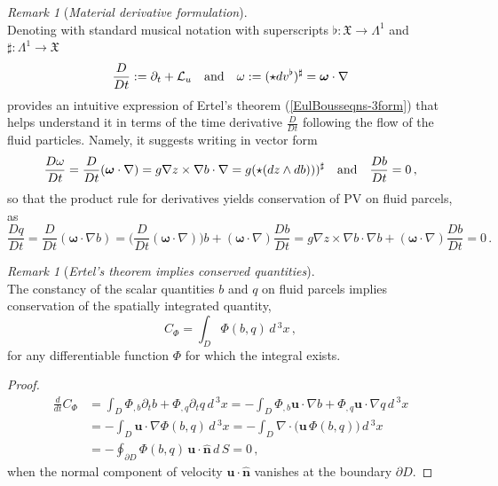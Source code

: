 \documentclass[11pt, oneside]{article}   	%
\numberwithin{equation}{section}
\theoremstyle{plain}
\theoremstyle{definition}
\theoremstyle{remark}
\newtheorem{remark}[theorem]{Remark}
\newcommand{\<}{\langle}
\renewcommand{\>}{\rangle}
\begin{document}
 \begin{remark}[\emph{Material derivative formulation}]$\,$\\ \textrm
% 
Denoting with standard musical notation with superscripts $\flat: \mathfrak{X}\to \Lambda^1$ and $\sharp: \Lambda^1 \to \mathfrak{X}$
\[
\frac{D}{Dt} := \partial_t +  \mathcal{L}_u
\quad\hbox{and}\quad
\omega := ( \star dv^\flat  )^\sharp = \boldsymbol{\omega}\cdot\nabla
\]
provides an intuitive expression of Ertel's theorem (\ref{EulBousseqns-3form}) that helps understand it in terms of the time derivative $\frac{D}{Dt}$ following the flow of the fluid particles. Namely, it suggests writing in vector form
\[
\frac{D\omega}{Dt}
=
\frac{D}{Dt}(\boldsymbol{\omega}\cdot\nabla )
= g\nabla{z}\times\nabla{b}\cdot\nabla
= g (\star( dz\wedge db)) )^\sharp
\quad\hbox{and}\quad
\frac{Db}{Dt} = 0
\,,
\]
so that the product rule for derivatives yields conservation of PV on fluid parcels, as 
\[
\frac{Dq}{Dt}
=
\frac{D}{Dt}(\boldsymbol{\omega}\cdot\nabla{b})
=
\Big(\frac{D}{Dt}(\boldsymbol{\omega}\cdot\nabla)\Big)b
+
(\boldsymbol{\omega}\cdot\nabla)\frac{Db}{Dt}
= g\nabla{z}\times\nabla{b}\cdot\nabla{b} + 
(\boldsymbol{\omega}\cdot\nabla)\frac{Db}{Dt} = 0
\,.
\]
 
 \end{remark}

\begin{remark}[\emph{Ertel's theorem implies conserved quantities}]$\,$\\ \textrm
The constancy of the scalar quantities $b$ and $q$ on fluid parcels implies conservation of the spatially integrated quantity,
 \begin{equation}
 C_\Phi
 =
 \int_D \Phi(b,q)\,d\,^3x
 \,,
\label{EulBouss-conlaws}
\end{equation}
for any differentiable function $\Phi$  for which the integral exists. 
\begin{proof}
\begin{align*}
 \frac{d}{dt}C_\Phi
 &=
 \int_D \Phi_{,b}\partial_t b + \Phi_{,q}\partial_t q\,d\,^3x
=
- \int_D \Phi_{,b}\mathbf{u}\cdot\nabla{b} 
+ \Phi_{,q}\mathbf{u}\cdot\nabla{q}\,d\,^3x 
\\&=
- \int_D \mathbf{u}\cdot\nabla\Phi(b,q)\,d\,^3x 
=
- \int_D \nabla\cdot\big(\mathbf{u}\,\Phi(b,q)\big)\,d\,^3x 
\\&=
- \oint_{\partial D} \Phi(b,q)\,\mathbf{u}\cdot\mathbf{\hat{n}}\,d\,S 
=
0\,,
\end{align*}
when the normal component of velocity $\mathbf{u}\cdot\mathbf{\hat{n}}$ vanishes at the boundary $\partial D$. 

\end{proof}
\end{remark}
\end{document}

